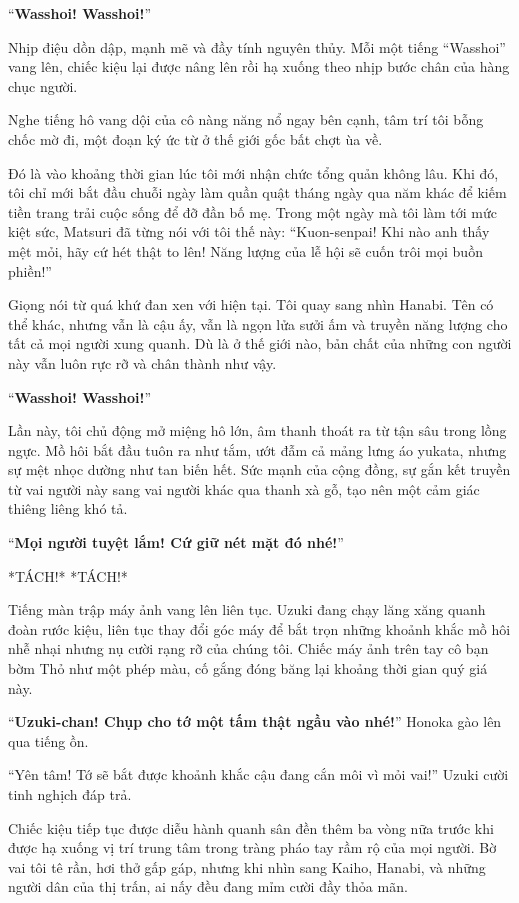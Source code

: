 \documentclass[../main.tex]{subfiles}
\begin{document}
``\textbf{Wasshoi! Wasshoi!}''

Nhịp điệu dồn dập, mạnh mẽ và đầy tính nguyên thủy. Mỗi một tiếng ``Wasshoi'' vang lên, chiếc kiệu lại được nâng lên rồi hạ xuống theo nhịp bước chân của hàng chục người.

Nghe tiếng hô vang dội của cô nàng năng nổ ngay bên cạnh, tâm trí tôi bỗng chốc mờ đi, một đoạn ký ức từ ở thế giới gốc bất chợt ùa về.

Đó là vào khoảng thời gian lúc tôi mới nhận chức tổng quản không lâu. Khi đó, tôi chỉ mới bắt đầu chuỗi ngày làm quần quật tháng ngày qua năm khác để kiếm tiền trang trải cuộc sống để đỡ đần bố mẹ. Trong một ngày mà tôi làm tới mức kiệt sức, Matsuri đã từng nói với tôi thế này: ``Kuon-senpai! Khi nào anh thấy mệt mỏi, hãy cứ hét thật to lên! Năng lượng của lễ hội sẽ cuốn trôi mọi buồn phiền!''

Giọng nói từ quá khứ đan xen với hiện tại. Tôi quay sang nhìn Hanabi. Tên có thể khác, nhưng vẫn là cậu ấy, vẫn là ngọn lửa sưởi ấm và truyền năng lượng cho tất cả mọi người xung quanh. Dù là ở thế giới nào, bản chất của những con người này vẫn luôn rực rỡ và chân thành như vậy.

``\textbf{Wasshoi! Wasshoi!}''

Lần này, tôi chủ động mở miệng hô lớn, âm thanh thoát ra từ tận sâu trong lồng ngực. Mồ hôi bắt đầu tuôn ra như tắm, ướt đẫm cả mảng lưng áo yukata, nhưng sự mệt nhọc dường như tan biến hết. Sức mạnh của cộng đồng, sự gắn kết truyền từ vai người này sang vai người khác qua thanh xà gỗ, tạo nên một cảm giác thiêng liêng khó tả.

``\textbf{Mọi người tuyệt lắm! Cứ giữ nét mặt đó nhé!}''

*TÁCH!* *TÁCH!*

Tiếng màn trập máy ảnh vang lên liên tục. Uzuki đang chạy lăng xăng quanh đoàn rước kiệu, liên tục thay đổi góc máy để bắt trọn những khoảnh khắc mồ hôi nhễ nhại nhưng nụ cười rạng rỡ của chúng tôi. Chiếc máy ảnh trên tay cô bạn bờm Thỏ như một phép màu, cố gắng đóng băng lại khoảng thời gian quý giá này.

``\textbf{Uzuki-chan! Chụp cho tớ một tấm thật ngầu vào nhé!}'' Honoka gào lên qua tiếng ồn.

``Yên tâm! Tớ sẽ bắt được khoảnh khắc cậu đang cắn môi vì mỏi vai!'' Uzuki cười tinh nghịch đáp trả.

Chiếc kiệu tiếp tục được diễu hành quanh sân đền thêm ba vòng nữa trước khi được hạ xuống vị trí trung tâm trong tràng pháo tay rầm rộ của mọi người. Bờ vai tôi tê rần, hơi thở gấp gáp, nhưng khi nhìn sang Kaiho, Hanabi, và những người dân của thị trấn, ai nấy đều đang mỉm cười đầy thỏa mãn.
\end{document}
